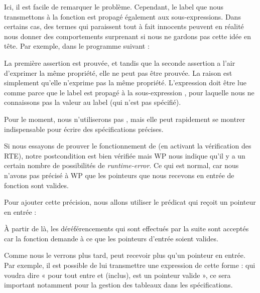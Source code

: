 

Ici, il est facile de remarquer le problème. Cependant, le label que nous
transmettons à la fonction  est propagé également
aux sous-expressions. Dans certains cas, des termes qui paraissent tout à fait
innocents peuvent en réalité nous donner des comportements surprenant si nous
ne gardons pas cette idée en tête. Par exemple, dans le programme suivant :




La première assertion est prouvée, et tandis que la seconde assertion a l'air
d'exprimer la même propriété, elle ne peut pas être prouvée. La raison est
simplement qu'elle n'exprime pas la même propriété. L'expression
 doit être lue comme
 parce que le
label est propagé à la sous-expression , pour laquelle nous ne
connaissons pas la valeur au label  (qui n'est pas spécifié).


Pour le moment, nous n'utiliserons pas , mais
elle peut rapidement se montrer indispensable pour écrire des spécifications
précises.





Si nous essayons de prouver le fonctionnement de  (en activant
la vérification des RTE), notre postcondition est bien vérifiée mais WP nous
indique qu'il y a un certain nombre de possibilités de \textit{runtime-error}. Ce qui
est normal, car nous n'avons pas précisé à WP que les pointeurs que nous
recevons en entrée de fonction sont valides.



Pour ajouter cette précision, nous allons utiliser le prédicat  qui
reçoit un pointeur en entrée :






À partir de là, les déréférencements qui sont effectués par la suite sont
acceptés car la fonction demande à ce que les pointeurs d'entrée soient
valides.



Comme nous le verrons plus tard,  peut recevoir plus qu'un
pointeur en entrée. Par exemple, il est possible de lui transmettre une
expression de cette forme :  qui voudra dire « pour
tout  entre  et  (inclus),  est un pointeur valide », ce sera important
notamment pour la gestion des tableaux dans les spécifications.



